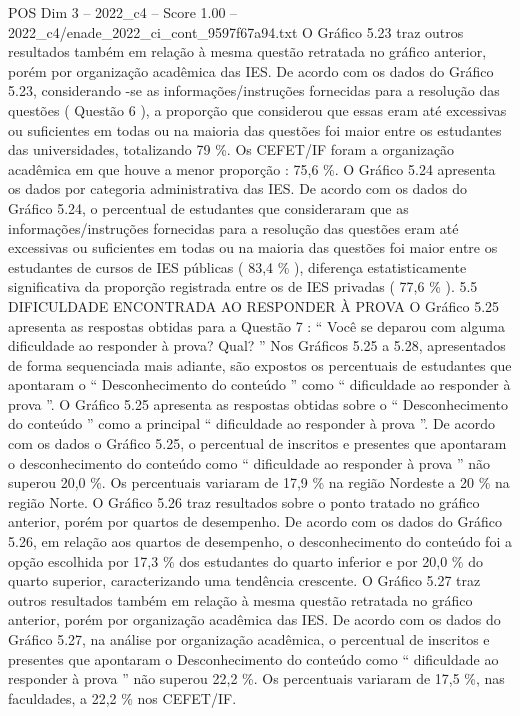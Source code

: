 \begin{textsample}{POS Dim 3 – 2022\_c4 – Score 1.00 – 2022\_c4/enade\_2022\_ci\_cont\_9597f67a94.txt}
O Gráfico 5.23 traz outros resultados também em relação à mesma questão retratada no gráfico anterior, porém por organização acadêmica das IES.
De acordo com os dados do Gráfico 5.23, considerando -se as informações/instruções fornecidas para a resolução das questões ( Questão 6 ), a proporção que considerou que essas eram até excessivas ou suficientes em todas ou na maioria das questões foi maior entre os estudantes das universidades, totalizando 79 \%.
Os CEFET/IF foram a organização acadêmica em que houve a menor proporção : 75,6 \%.
O Gráfico 5.24 apresenta os dados por categoria administrativa das IES.
De acordo com os dados do Gráfico 5.24, o percentual de estudantes que consideraram que as informações/instruções fornecidas para a resolução das questões eram até excessivas ou suficientes em todas ou na maioria das questões foi maior entre os estudantes de cursos de IES públicas ( 83,4 \% ), diferença estatisticamente significativa da proporção registrada entre os de IES privadas ( 77,6 \% ). 5.5 DIFICULDADE ENCONTRADA AO RESPONDER À PROVA O Gráfico 5.25 apresenta as respostas obtidas para a Questão 7 : “ Você se deparou com alguma dificuldade ao responder à prova?
Qual? ” Nos Gráficos 5.25 a 5.28, apresentados de forma sequenciada mais adiante, são expostos os percentuais de estudantes que apontaram o “ Desconhecimento do conteúdo ” como “ dificuldade ao responder à prova ”.
O Gráfico 5.25 apresenta as respostas obtidas sobre o “ Desconhecimento do conteúdo ” como a principal “ dificuldade ao responder à prova ”.
De acordo com os dados o Gráfico 5.25, o percentual de inscritos e presentes que apontaram o desconhecimento do conteúdo como “ dificuldade ao responder à prova ” não superou 20,0 \%.
Os percentuais variaram de 17,9 \% na região Nordeste a 20 \% na região Norte.
O Gráfico 5.26 traz resultados sobre o ponto tratado no gráfico anterior, porém por quartos de desempenho.
De acordo com os dados do Gráfico 5.26, em relação aos quartos de desempenho, o desconhecimento do conteúdo foi a opção escolhida por 17,3 \% dos estudantes do quarto inferior e por 20,0 \% do quarto superior, caracterizando uma tendência crescente.
O Gráfico 5.27 traz outros resultados também em relação à mesma questão retratada no gráfico anterior, porém por organização acadêmica das IES.
De acordo com os dados do Gráfico 5.27, na análise por organização acadêmica, o percentual de inscritos e presentes que apontaram o Desconhecimento do conteúdo como “ dificuldade ao responder à prova ” não superou 22,2 \%.
Os percentuais variaram de 17,5 \%, nas faculdades, a 22,2 \% nos CEFET/IF.

\end{textsample}
